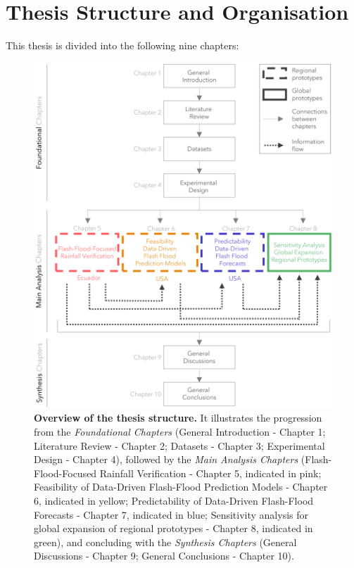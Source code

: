 \section{Thesis Structure and Organisation}
This thesis is divided into the following nine chapters:

\begin{figure}[htbp]
\centering
\includegraphics[width=\textwidth]{01_thesis_roadmap.png}
\caption{\textbf{Overview of the thesis structure.} It illustrates the progression from the \textit{Foundational Chapters} (General Introduction - Chapter 1; Literature Review - Chapter 2; Datasets - Chapter 3; Experimental Design - Chapter 4), followed by the \textit{Main Analysis Chapters} (Flash-Flood-Focused Rainfall Verification - Chapter 5, indicated in pink; Feasibility of Data-Driven Flash-Flood Prediction Models - Chapter 6, indicated in yellow; Predictability of Data-Driven Flash-Flood Forecasts - Chapter 7, indicated in blue; Sensitivity analysis for global expansion of regional prototypes - Chapter 8, indicated in green), and concluding with the \textit{Synthesis Chapters} (General Discussions - Chapter 9; General Conclusions - Chapter 10).}
\label{fig:thesis_structure}
\end{figure}

